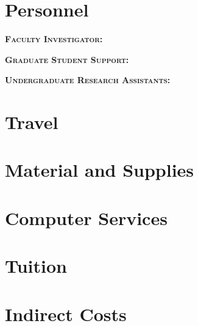 \thispagestyle{empty}


\section{Personnel}

\textbf{\textsc{Faculty Investigator:}}

\textbf{\textsc{Graduate Student Support:}} 
  
\textbf{\textsc{Undergraduate Research Assistants:}} 

\section{Travel}

\section{Material and Supplies}

\section{Computer Services}

\section{Tuition}

\section{Indirect Costs}
